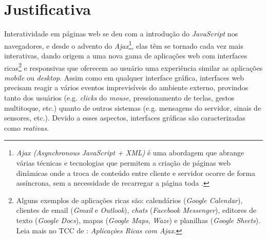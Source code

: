 \section{Justificativa}\label{ljustificativa}

Interatividade em páginas web se deu com a
introdução do \emph{JavaScript} nos navegadores,
e desde o advento do \emph{Ajax}\footnote{
  \emph{Ajax (Asynchronous JavaScript + XML)} é uma
  abordagem que abrange várias técnicas e
  tecnologias que permitem a criação de páginas web
  dinâmicas onde a troca de conteúdo entre cliente e
  servidor ocorre de forma assíncrona, sem a necessidade
  de recarregar a página toda \cite{garrett2005ajax}.
},
elas têm se tornado cada vez mais interativas,
dando origem a uma nova gama de aplicações web com interfaces
ricas\footnote{
  Alguns exemplos de aplicações ricas são:
  calendários (\emph{Google Calendar}),
  clientes de email (\emph{Gmail} e \emph{Outlook}),
  \emph{chats} (\emph{Facebook Messenger}),
  editores de texto (\emph{Google Docs}),
  mapas (\emph{Google Maps}, \emph{Waze}) e
  planilhas (\emph{Google Sheets}).
  Leia mais no TCC de :
  \emph{Aplicações Ricas com Ajax}.
} e responsivas que oferecem ao usuário uma experiência
similar as aplicações \emph{mobile} ou \emph{desktop}.
Assim como em qualquer interface gráfica, interfaces web
precisam reagir a vários eventos imprevisíveis do ambiente
externo, provindos tanto dos usuários (e.g. \emph{clicks}
do \emph{mouse}, pressionamento de teclas, gestos multitoque,
etc.) quanto de outros sistemas (e.g. mensagens do servidor,
sinais de sensores, etc.).
Devido a esses aspectos, interfaces gráficas são caracterizadas
como \emph{reativas}.


